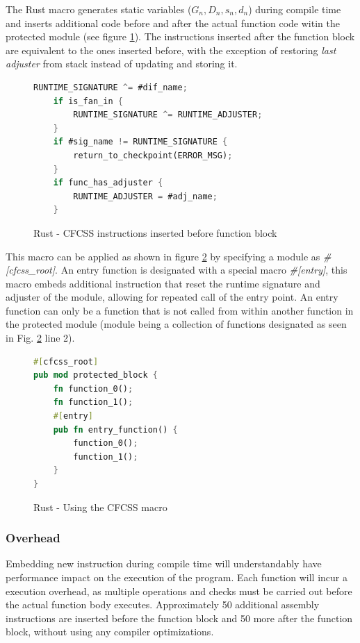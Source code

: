 The Rust macro generates static variables ({$G_n, D_n, s_n, d_n$}) during compile time and inserts additional code before and after the actual function code witin the protected module (see figure \ref{fig:rust_cfcss_macro}). The instructions inserted after the function block are equivalent to the ones inserted before, with the exception of restoring \textit{last adjuster} from stack instead of updating and storing it.

\begin{figure}[!h]
    \begin{lstlisting}[language=Rust]
    RUNTIME_SIGNATURE ^= #dif_name;
    if is_fan_in {
        RUNTIME_SIGNATURE ^= RUNTIME_ADJUSTER;
    }
    if #sig_name != RUNTIME_SIGNATURE {
        return_to_checkpoint(ERROR_MSG);
    }
    if func_has_adjuster {
        RUNTIME_ADJUSTER = #adj_name;
    }
    \end{lstlisting}
    \caption{Rust - CFCSS instructions inserted before function block}
    \label{fig:rust_cfcss_macro}
    \end{figure}

This macro can be applied as shown in figure \ref{fig:rust_cfcss_macro_example} by specifying a module as \textit{\#[cfcss\_root]}. An entry function is designated with a special macro \textit{\#[entry]}, this macro embeds additional instruction that reset the runtime signature and adjuster of the module, allowing for repeated call of the entry point. An entry function can only be a function that is not called from within another function in the protected module (module being a collection of functions designated as seen in Fig. \ref{fig:rust_cfcss_macro_example} line 2).

\begin{figure}[!h]
\begin{lstlisting}[language=Rust]
#[cfcss_root]
pub mod protected_block {
    fn function_0();
    fn function_1();
    #[entry]
    pub fn entry_function() {
        function_0();
        function_1();
    }
}
\end{lstlisting}
\caption{Rust - Using the CFCSS macro}
\label{fig:rust_cfcss_macro_example}
\end{figure}

\subsubsection{Overhead}

Embedding new instruction during compile time will understandably have performance impact on the execution of the program. Each function will incur a execution overhead, as multiple operations and checks must be carried out before the actual function body executes. Approximately 50 additional assembly instructions are inserted before the function block and 50 more after the function block, without using any compiler optimizations.

